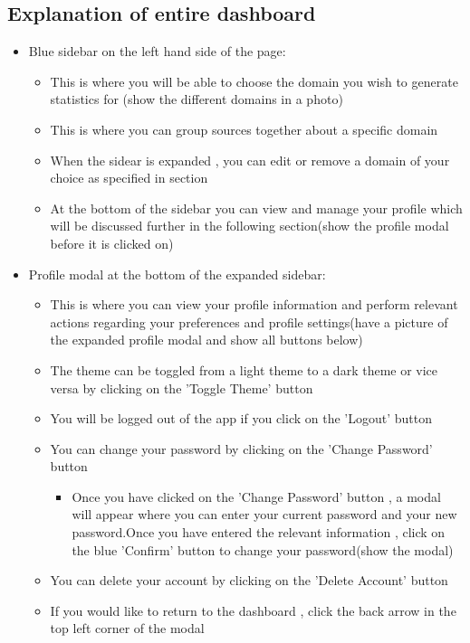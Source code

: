 \documentclass[12pt]{article}
\begin{document}
\subsection{Explanation of entire dashboard}
\begin{itemize}
    \item Blue sidebar on the left hand side of the page:
    \begin{itemize}
        \item This is where you will be able to choose the domain you wish to generate statistics for (show the different domains in a photo)
        \item This is where you can group sources together about a specific domain
        \item When the sidear is expanded , you can edit or remove a domain of your choice as specified in section 
        \item At the bottom of the sidebar you can view and manage your profile which will be discussed further in the following section(show the profile modal before it is clicked on)
    \end{itemize}
    \item Profile modal at the bottom of the expanded sidebar:
    \begin{itemize}
        \item This is where you can view your profile information and perform relevant actions regarding your preferences and profile settings(have a picture of the expanded profile modal and show all buttons below)
        \item The theme can be toggled from a light theme to a dark theme or vice versa by clicking on the 'Toggle Theme' button
        \item You will be logged out of the app if you click on the 'Logout' button
        \item You can change your password by clicking on the 'Change Password' button
        \begin{itemize}
            \item Once you have clicked on the 'Change Password' button , a modal will appear where you can enter your current password and your new password.Once you have entered the relevant information , click on the blue 'Confirm' button to change your password(show the modal)
        \end{itemize}
        \item You can delete your account by clicking on the 'Delete Account' button
        \item If you would like to return to the dashboard , click the back arrow in the top left corner of the modal

\end{itemize}
\end{itemize}
\end{document}
